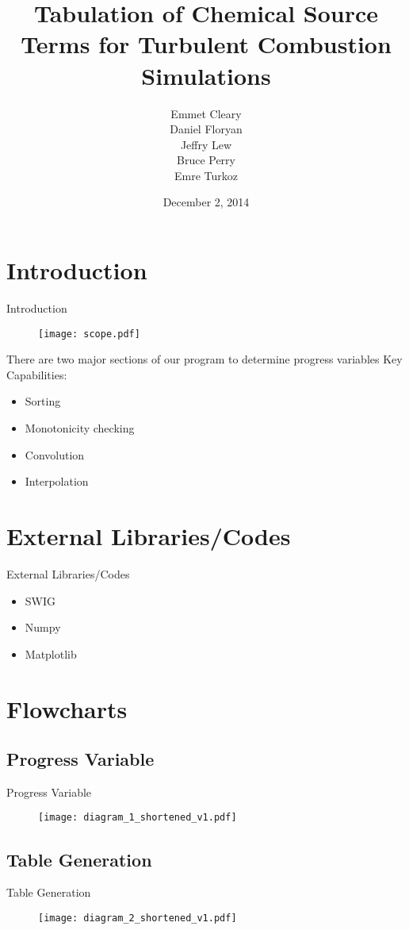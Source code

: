 \documentclass{beamer}
\title[APC 524 Design Review]{Tabulation of Chemical Source Terms for Turbulent Combustion Simulations}
\author{Emmet Cleary \\
Daniel Floryan \\
Jeffry Lew \\
Bruce Perry \\
Emre Turkoz}
\date{December 2, 2014}
\begin{document}
\begin{frame}
  \titlepage
\end{frame}


\section{Introduction}
\begin{frame}{Introduction}
\begin{figure}
\texttt{[image: scope.pdf]}
\end{figure}
\vskip 5mm
There are two major sections of our program to determine progress variables
\vskip 5mm
Key Capabilities:
\begin{itemize}
\item Sorting
\item Monotonicity checking
\item Convolution
\item Interpolation
\end{itemize}
\end{frame}

\section{External Libraries/Codes}
\begin{frame}{External Libraries/Codes}
\begin{itemize}
\item SWIG
\item Numpy
\item Matplotlib
\end{itemize}
\end{frame}

\section{Flowcharts}

\subsection{Progress Variable}
\begin{frame}{Progress Variable}
\begin{figure}
\texttt{[image: diagram\_1\_shortened\_v1.pdf]}
\end{figure}
\end{frame}

\subsection{Table Generation}
\begin{frame}{Table Generation}
\begin{figure}
\texttt{[image: diagram\_2\_shortened\_v1.pdf]}
\end{figure}
\end{frame}
\end{document}
